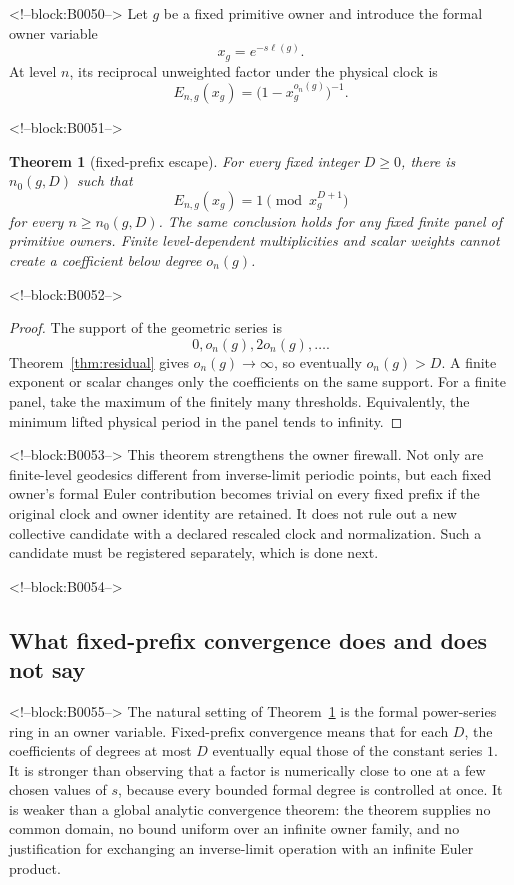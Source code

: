 \documentclass[11pt]{article}
\newtheorem{theorem}{Theorem}[section]
\theoremstyle{definition}
\theoremstyle{remark}
\begin{document}
<!--block:B0050-->
Let $g$ be a fixed primitive owner and introduce the formal owner variable
\[
x_g=e^{-s\ell(g)}.
\]
At level $n$, its reciprocal unweighted factor under the physical clock is
\[
E_{n,g}(x_g)=\bigl(1-x_g^{o_n(g)}\bigr)^{-1}.
\]

<!--block:B0051-->
\begin{theorem}[fixed-prefix escape]\label{thm:prefix}
For every fixed integer $D\geq0$, there is $n_0(g,D)$ such that
\[
E_{n,g}(x_g)=1\pmod{x_g^{D+1}}
\]
for every $n\geq n_0(g,D)$. The same conclusion holds for any fixed finite panel of primitive owners. Finite level-dependent multiplicities and scalar weights cannot create a coefficient below degree $o_n(g)$.
\end{theorem}

<!--block:B0052-->
\begin{proof}
The support of the geometric series is
\[
0,o_n(g),2o_n(g),\ldots.
\]
Theorem~\ref{thm:residual} gives $o_n(g)\to\infty$, so eventually $o_n(g)>D$. A finite exponent or scalar changes only the coefficients on the same support. For a finite panel, take the maximum of the finitely many thresholds. Equivalently, the minimum lifted physical period in the panel tends to infinity.
\end{proof}

<!--block:B0053-->
This theorem strengthens the owner firewall. Not only are finite-level geodesics different from inverse-limit periodic points, but each fixed owner's formal Euler contribution becomes trivial on every fixed prefix if the original clock and owner identity are retained. It does not rule out a new collective candidate with a declared rescaled clock and normalization. Such a candidate must be registered separately, which is done next.

<!--block:B0054-->
\subsection{What fixed-prefix convergence does and does not say}

<!--block:B0055-->
The natural setting of Theorem~\ref{thm:prefix} is the formal power-series ring in an owner variable. Fixed-prefix convergence means that for each $D$, the coefficients of degrees at most $D$ eventually equal those of the constant series $1$. It is stronger than observing that a factor is numerically close to one at a few chosen values of $s$, because every bounded formal degree is controlled at once. It is weaker than a global analytic convergence theorem: the theorem supplies no common domain, no bound uniform over an infinite owner family, and no justification for exchanging an inverse-limit operation with an infinite Euler product.
\end{document}
